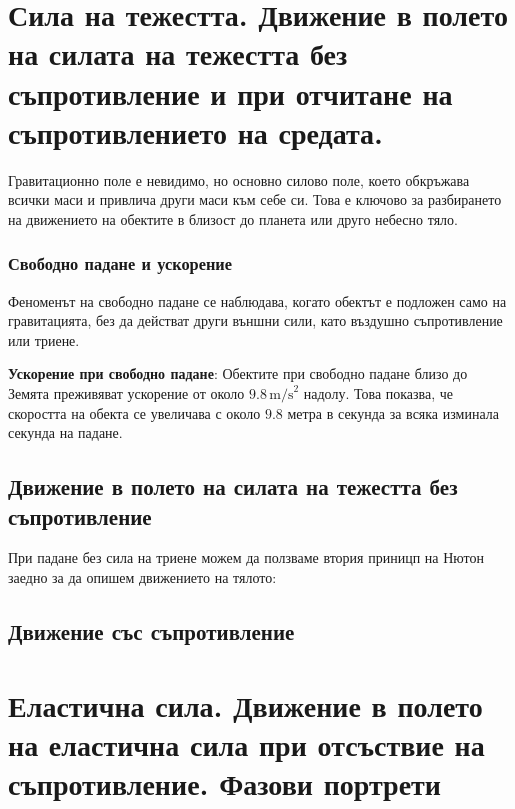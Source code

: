 \documentclass{report}
\begin{document}
\section{Сила на тежестта. Движение в полето на силата на тежестта без съпротивление и
при отчитане на съпротивлението на средата.}

Гравитационно поле е невидимо, но основно силово поле, което обкръжава всички маси и привлича други маси към себе си. Това е ключово за разбирането на движението на обектите в близост до планета или друго небесно тяло.


\subsubsection{Свободно падане и ускорение}
Феноменът на свободно падане се наблюдава, когато обектът е подложен само на гравитацията, без да действат други външни сили, като въздушно съпротивление или триене.

\textbf{Ускорение при свободно падане}: Обектите при свободно падане близо до Земята преживяват ускорение от около $9.8 \, \text{m/s}^2$ надолу. Това показва, че скоростта на обекта се увеличава с около $9.8$ метра в секунда за всяка изминала секунда на падане.
\subsection{Движение в полето на силата на тежестта без съпротивление}
При падане без сила на триене можем да ползваме втория приницп на Нютон заедно за да опишем движението на тялото:

\subsection{Движение със съпротивление}
\newpage
\section{Еластична сила. Движение в полето на еластична сила при отсъствие на
съпротивление. Фазови портрети}
\end{document}
